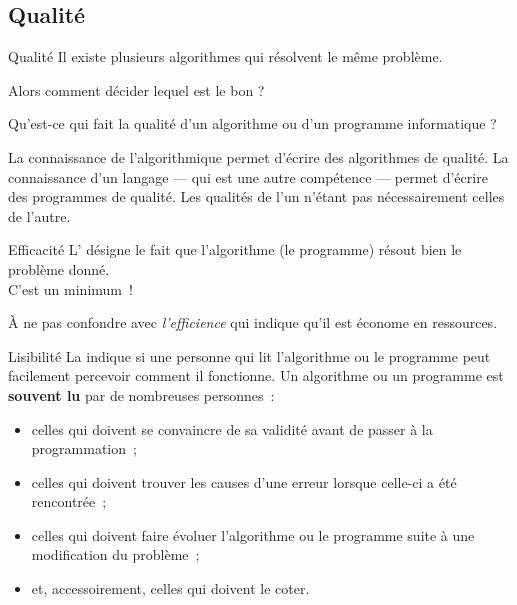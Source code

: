 \subsection{Qualité}
\begin{frame}{Qualité}
  Il existe plusieurs algorithmes qui résolvent le même problème.

  Alors comment décider lequel est le bon ?

  Qu'est-ce qui fait la qualité d'un algorithme ou d'un programme
  informatique ?

  La connaissance de l'algorithmique permet d'écrire des algorithmes de
  qualité. La connaissance d'un langage --- qui est une autre compétence
  --- permet d'écrire des programmes de qualité. Les qualités de l'un
  n'étant pas nécessairement celles de l'autre.
\end{frame}

\begin{frame}{Efficacité}
  L’
  désigne le fait que l’algorithme (le programme) résout bien le
  problème donné.\\
  C’est un minimum~!

  À ne pas confondre avec \emph{l’efficience}
  qui indique qu’il est économe en ressources.
\end{frame}

\begin{frame}{Lisibilité}
  La  indique si une personne qui lit l’algorithme
  ou le programme peut facilement percevoir comment il fonctionne.
  Un algorithme ou un programme est \textbf{souvent
  lu} par de nombreuses personnes~:
  \begin{itemize}
    \item
      celles qui doivent se convaincre de sa validité
      avant de passer à la programmation~;
    \item
      celles qui doivent trouver les causes
      d’une erreur lorsque celle-ci a été rencontrée~;
    \item
      celles qui doivent faire évoluer l’algorithme
      ou le programme suite à une modification
      du problème~;
    \item
      et, accessoirement, celles qui doivent le coter.
  \end{itemize}


\end{frame}

